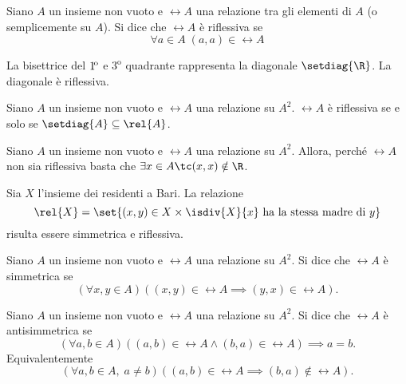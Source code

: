 \begin{definition}\label{def:relazione_riflessiva}
    Siano \(A\) un insieme non vuoto e \(\rel{A}\) una relazione tra gli elementi di \(A\) (o semplicemente su \(A\)). Si dice che \(\rel{A}\) è riflessiva se
    \[
        \forall a \in A \; (a, a) \in \rel{A}
    \]
\end{definition}

\begin{example}
    La bisettrice del \(1^\text{\!o}\) e \(3^\text{o}\) quadrante rappresenta la diagonale \(\setdiag{\R}\). La diagonale è riflessiva.
    
\end{example}

\begin{remark}
    Siano \(A\) un insieme non vuoto e \(\rel{A}\) una relazione su \(A^2\). \(\rel{A}\) è riflessiva se e solo se \(\setdiag{A} \subseteq \rel{A}\).
\end{remark}

\begin{remark}
    Siano \(A\) un insieme non vuoto e \(\rel{A}\) una relazione su \(A^2\). Allora, perché \(\rel{A}\) non sia riflessiva basta che \(\exists x \in A \tc (x, x) \notin \R\).
\end{remark}


\begin{example}
    Sia \(X\) l'insieme dei residenti a Bari. La relazione
    \[
        \rel{X} = \set{(x, y) \in X \times \isdiv{X}{x} \text{ ha la stessa madre di } y}
    \]
    risulta essere simmetrica e riflessiva.
\end{example}

\begin{definition}\label{def:relazione_simmetrica}
    Siano \(A\) un insieme non vuoto e \(\rel{A}\) una relazione su \(A^2\). Si dice che \(\rel{A}\) è simmetrica se
    \[
        \left(\forall x,y \in A\right)\left((x, y) \in \rel{A} \implies (y, x) \in \rel{A} \right).
    \]
\end{definition}

\begin{definition}\label{def:relazione_antisimmetrica}
    Siano \(A\) un insieme non vuoto e \(\rel{A}\) una relazione su \(A^2\). Si dice che \(\rel{A}\) è antisimmetrica se
    \[
        \left(\forall a,b \in A\right) \left((a, b) \in \rel{A} \land (b, a) \in \rel{A}\right) \implies a = b.
    \]
    Equivalentemente
    \[
        (\forall a,b \in A, \; a \neq b) \left((a, b) \in \rel{A} \implies (b, a) \notin \rel{A}\right).
    \]
\end{definition}

